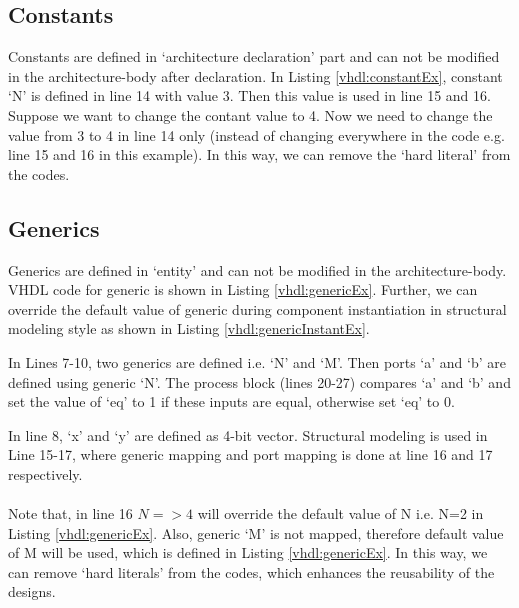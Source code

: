 \subsection{Constants}\label{sec:Constants}
Constants are defined in `architecture declaration' part and can not be modified in the architecture-body after declaration. In Listing \ref{vhdl:constantEx}, constant `N' is defined in line 14 with value 3. Then this value is used in line 15 and 16. Suppose we want to change the contant value to 4. Now we need to change the value from 3 to 4 in line 14 only (instead of changing everywhere in the code e.g. line 15 and 16 in this example). In this way, we can remove the `hard literal' from the codes.  



\subsection{Generics}\label{subsec:Generic}
Generics are defined in `entity' and can not be modified in the architecture-body. VHDL code for generic is shown in Listing \ref{vhdl:genericEx}. Further, we can override the default value of generic during component instantiation in structural modeling style as shown in Listing \ref{vhdl:genericInstantEx}. 

\begin{explanation}
	In Lines 7-10, two generics are defined i.e. `N' and `M'. Then ports `a' and `b' are defined using generic `N'. The process block (lines 20-27) compares `a' and `b' and set the value of `eq' to 1 if these inputs are equal, otherwise set `eq' to 0. 
\end{explanation}


\begin{explanation}
	In line 8, `x' and `y' are defined as 4-bit vector. Structural modeling is used in Line 15-17, where generic mapping and port mapping is done at line 16 and 17 respectively. 
	\\ \\
	Note that, in line 16 $N=>4$ will override the default value of N i.e. N=2 in Listing \ref{vhdl:genericEx}. Also, generic `M' is not mapped, therefore default value of M will be used, which is defined in Listing \ref{vhdl:genericEx}. In this way, we can remove `hard literals' from the codes, which enhances the reusability of the designs. 
\end{explanation}




